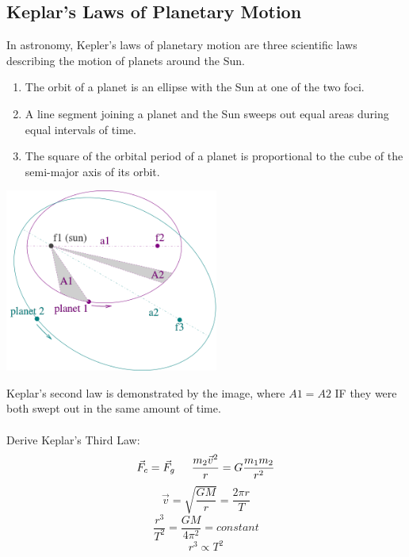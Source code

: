 \documentclass{article}
\begin{document}
	\subsection{Keplar's Laws of Planetary Motion}
        In astronomy, Kepler's laws of planetary motion are three scientific laws describing the motion of planets around the Sun.
        \vspace{1ex}
        \begin{enumerate}
        	\item The orbit of a planet is an ellipse with the Sun at one of the two foci.
            \item A line segment joining a planet and the Sun sweeps out equal areas during equal intervals of time.
            \item The square of the orbital period of a planet is proportional to the cube of the semi-major axis of its orbit.
        \end{enumerate}
        \begin{multicols}{2}
        	\centerline{\includegraphics[width=7cm]{keplar.png}}
		\columnbreak
        	Keplar's second law is demonstrated by the image, where $A1=A2$ IF they were both swept out in the same amount of time.
            \\\\
            Derive Keplar's Third Law:
            \[
            	\vec{F}_c=\vec{F}_g \indent
                \frac{m_2\vec{v}^2}{r}=G\frac{m_1m_2}{r^2}
            \]
            \[
            	\vec{v}=\sqrt{\frac{GM}{r}}=\frac{2\pi r}{T}
            \]
            \[
            	\frac{r^3}{T^2}=\frac{GM}{4\pi^2} = constant
            \]
            \[
            	r^3 \propto T^2
            \]
        \end{multicols}
        
\end{document}
